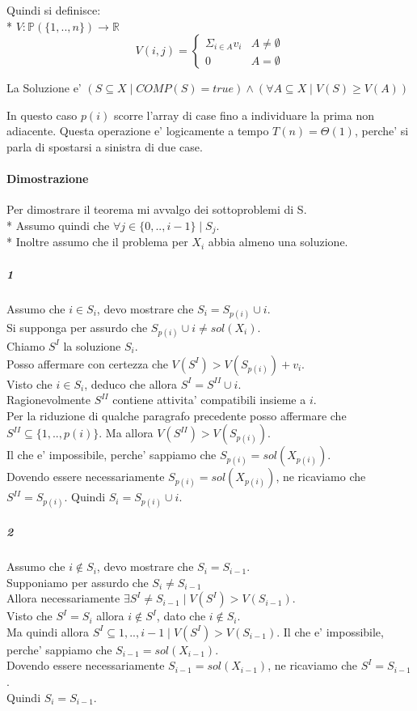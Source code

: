 Quindi si definisce: \\*
$V : \mathbb{P}(\{1,..,n\}) \rightarrow \mathbb{R}$
\[
    V(i,j) =
    \begin{cases}
        \text{$\Sigma _ {i \in A} v_i$} & \text{$A \ne \emptyset$} \\
        \text{$0$} & \text{$A = \emptyset$}
    \end{cases}
\]

La Soluzione e' $(S \subseteq X \mid COMP(S) = true) \land (\forall A \subseteq X \mid V(S) \geq V(A))$

In questo caso $p(i)$ scorre l'array di case fino a individuare la prima non adiacente.
Questa operazione e' logicamente a tempo $T(n) = \Theta(1)$, perche' si parla di spostarsi a sinistra di due case.

\paragraph{Dimostrazione}

Per dimostrare il teorema mi avvalgo dei sottoproblemi di S. \\*
Assumo quindi che $\forall j \in \{0,..,i-1\} \mid S_j$. \\*
Inoltre assumo che il problema per $X_i$ abbia almeno una soluzione.

\subparagraph{1}

Assumo che $i \in S_i$, devo mostrare che $S_i = S_{p(i)} \cup {i}$. \\
Si supponga per assurdo che $S_{p(i)} \cup {i} \ne sol(X_i)$. \\
Chiamo $S^I$ la soluzione ${S_i}$. \\
Posso affermare con certezza che $V(S^I) > V(S_{p(i)}) + v_i$. \\
Visto che $i \in S_i$, deduco che allora $S^I = S^{II} \cup {i}$. \\
Ragionevolmente $S^{II}$ contiene attivita' compatibili insieme a $i$. \\
Per la riduzione di qualche paragrafo precedente posso affermare che $S^{II} \subseteq \{1,..,p(i)\}$.
Ma allora $V(S^{II}) > V(S_{p(i)})$. \\
Il che e' impossibile, perche' sappiamo che $S_{p(i)} = sol(X_{p(i)})$. \\
Dovendo essere necessariamente $S_{p(i)} = sol(X_{p(i)})$, ne ricaviamo che $S^{II} = S_{p(i)}$.
Quindi $S_i = S_{p(i)} \cup {i}$.

\subparagraph{2}

Assumo che $i \notin S_i$, devo mostrare che $S_i = S_{i-1}$. \\
Supponiamo per assurdo che $S_i \ne S_{i-1}$ \\
Allora necessariamente $\exists S^I \ne S_{i-1} \mid V(S^I) > V(S_{i-1})$. \\
Visto che $S^I = S_i$ allora $i \notin S^I$, dato che $i \notin S_i$. \\
Ma quindi allora $S^I \subseteq {1,..,i-1} \mid V(S^I) > V(S_{i-1})$.
Il che e' impossibile, perche' sappiamo che $S_{i-1} = sol(X_{i-1})$. \\
Dovendo essere necessariamente $S_{i-1} = sol(X_{i-1})$, ne ricaviamo che $S^{I} = S_{i-1}$. \\
Quindi $S_i = S_{i-1}$.

